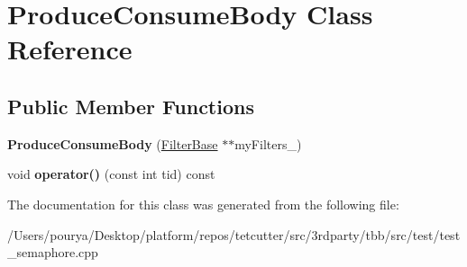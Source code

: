 \hypertarget{classProduceConsumeBody}{}\section{Produce\+Consume\+Body Class Reference}
\label{classProduceConsumeBody}
\subsection*{Public Member Functions}
\begin{DoxyCompactItemize}
\item 
\hypertarget{classProduceConsumeBody_a082b710c508388a2a5cbd082df098939}{}{\bfseries Produce\+Consume\+Body} (\hyperlink{classFilterBase}{Filter\+Base} $\ast$$\ast$my\+Filters\+\_\+)\label{classProduceConsumeBody_a082b710c508388a2a5cbd082df098939}

\item 
\hypertarget{classProduceConsumeBody_ace3e0cf3c4cb698595f852e1b3e0edb0}{}void {\bfseries operator()} (const int tid) const \label{classProduceConsumeBody_ace3e0cf3c4cb698595f852e1b3e0edb0}

\end{DoxyCompactItemize}


The documentation for this class was generated from the following file\+:\begin{DoxyCompactItemize}
\item 
/\+Users/pourya/\+Desktop/platform/repos/tetcutter/src/3rdparty/tbb/src/test/test\+\_\+semaphore.\+cpp\end{DoxyCompactItemize}
